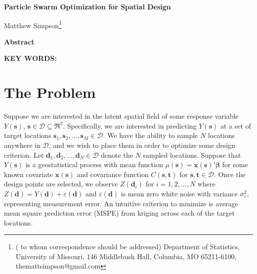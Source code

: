 \documentclass[12pt]{article}
\begin{document}
\thispagestyle{empty} \baselineskip=28pt

\begin{center}
{\LARGE{\bf Particle Swarm Optimization for Spatial Design}}
\end{center}

\baselineskip=12pt
\vskip 2mm
\blind
{
  \begin{center}
    Matthew Simpson\footnote{(\baselineskip=10pt to whom correspondence should be addressed)
      Department of Statistics, University of Missouri,
      146 Middlebush Hall, Columbia, MO 65211-6100, themattsimpson@gmail.com}
  \end{center}
} \fi

\vskip 2mm
\begin{center}
{\large{\bf Abstract}}
\end{center}
\baselineskip=12pt 

\baselineskip=12pt
\par\vfill\noindent
{\bf KEY WORDS:} 

\par\medskip\noindent


\clearpage\pagebreak\newpage {}
\baselineskip=24pt

\section{The Problem}
Suppose we are interested in the latent spatial field of some response variable $Y(\bm{s})$, $\bm{s}\in \mathcal{D}\subseteq \Re^2$. Specifically, we are interested in predicting $Y(\bm{s})$ at a set of target locations $\bm{s}_1, \bm{s}_2, \dots, \bm{s}_M\in\mathcal{D}$. We have the ability to sample $N$ locations anywhere in $\mathcal{D}$, and we wish to place them in order to optimize some design criterion. Let $\bm{d}_1, \bm{d}_2, \dots, \bm{d}_N\in\mathcal{D}$ denote the $N$ sampled locations. Suppose that $Y(\bm{s})$ is a geostatistical process with mean function $\mu(\bm{s})=\bm{x}(\bm{s})'\bm{\beta}$ for some known covariate $\bm{x}(\bm{s})$ and covariance function $C(\bm{s}, \bm{t})$ for $\bm{s},\bm{t}\in\mathcal{D}$. Once the design points are selected, we observe $Z(\bm{d}_i)$ for $i=1,2,\dots,N$ where $Z(\bm{d}) = Y(\bm{d}) + \varepsilon(\bm{d})$ and $\varepsilon(\bm{d})$ is mean zero white noise with variance $\sigma^2_{\varepsilon}$, representing measurement error. An intuitive criterion to minimize is average mean square prediction error (MSPE) from kriging across each of the target locations. 
\end{document}
